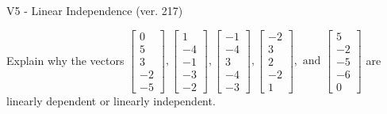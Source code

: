 \begin{exercise}
  \begin{exerciseTitle}V5 - Linear Independence (ver. 217)\end{exerciseTitle}
  \begin{exerciseStatement}
    Explain why the vectors \(\left[\begin{array}{r}
0 \\
5 \\
3 \\
-2 \\
-5
\end{array}\right] , \left[\begin{array}{r}
1 \\
-4 \\
-1 \\
-3 \\
-2
\end{array}\right] , \left[\begin{array}{r}
-1 \\
-4 \\
3 \\
-4 \\
-3
\end{array}\right] , \left[\begin{array}{r}
-2 \\
3 \\
2 \\
-2 \\
1
\end{array}\right] , \text{ and } \left[\begin{array}{r}
5 \\
-2 \\
-5 \\
-6 \\
0
\end{array}\right]\) are linearly dependent or linearly independent.	



\end{exerciseStatement}
\end{exercise}
